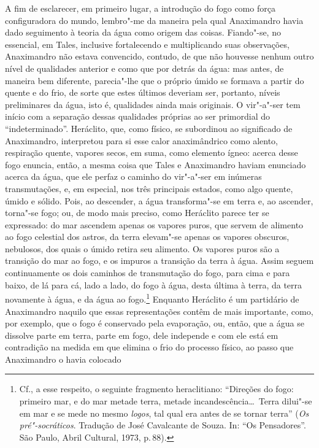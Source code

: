 A fim de esclarecer, em primeiro lugar, a introdução do fogo como força
configuradora do mundo, lembro"-me da maneira pela qual Anaximandro havia
dado seguimento à teoria da água como origem das coisas. Fiando"-se, no
essencial, em Tales, inclusive fortalecendo e multiplicando suas observações,
Anaximandro não estava convencido, contudo, de que não houvesse nenhum outro
nível de qualidades anterior e como que por detrás da água: mas antes, de
maneira bem diferente, parecia"-lhe que o próprio úmido se formava a partir
do quente e do frio, de sorte que estes últimos deveriam ser, portanto,
níveis preliminares da água, isto é, qualidades ainda mais originais. O
vir"-a"-ser tem início com a separação dessas qualidades próprias ao ser
primordial do ``indeterminado''. Heráclito, que, como físico, se subordinou
ao significado de Anaximandro, interpretou para si esse calor anaximândrico
como alento, respiração quente, vapores secos, em suma, como elemento ígneo:
acerca desse fogo enuncia, então, a mesma coisa que Tales e Anaximandro
haviam enunciado acerca da água, que ele perfaz o caminho do vir"-a"-ser em
inúmeras transmutações, e, em especial, nos três principais estados, como
algo quente, úmido e sólido. Pois, ao descender, a água transforma"-se em
terra e, ao ascender, torna"-se fogo; ou, de modo mais preciso, como
Heráclito parece ter se expressado: do mar ascendem apenas os vapores puros,
que servem de alimento ao fogo celestial dos astros, da terra elevam"-se
apenas os vapores obscuros, nebulosos, dos quais o úmido retira seu alimento.
Os vapores puros são a transição do mar ao fogo, e os impuros a transição da
terra à água. Assim seguem continuamente os dois caminhos de transmutação do
fogo, para cima e para baixo, de lá para cá, lado a lado, do fogo à água,
desta última à terra, da terra novamente à água, e da água ao fogo.\footnote{Cf., 
a esse respeito, o seguinte fragmento heraclitiano: ``Direções do
fogo: primeiro mar, e do mar metade terra, metade incandescência\ldots\ Terra
dilui"-se em mar e se mede no mesmo \textit{logos}, tal qual era antes de se
tornar terra'' (\textit{Os pré"-socráticos}. Tradução de José Cavalcante de
Souza. In: ``Os Pensadores''. São Paulo, Abril Cultural, 1973, p.\,88).}
Enquanto Heráclito é um partidário de Anaximandro naquilo que essas
representações contêm de mais importante, como, por exemplo, que o fogo é
conservado pela evaporação, ou, então, que a água se dissolve parte em terra,
parte em fogo, dele independe e com ele está em contradição na medida em que
elimina o frio do processo físico, ao passo que Anaximandro o havia colocado
